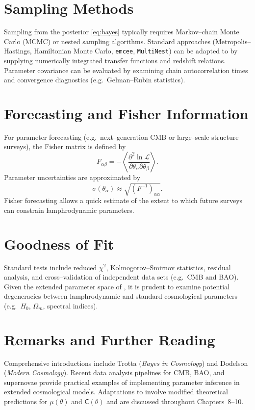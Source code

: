 \section{Sampling Methods}

Sampling from the posterior \eqref{eq:bayes} typically requires
Markov--chain Monte Carlo (MCMC) or nested sampling algorithms.
Standard approaches (Metropolis--Hastings, Hamiltonian Monte Carlo,
\texttt{emcee}, \texttt{MultiNest}) can be adapted to \rsvpabbr{} by
supplying numerically integrated transfer functions and redshift
relations.  Parameter covariance can be evaluated by examining chain
autocorrelation times and convergence diagnostics (e.g.\ Gelman--Rubin
statistics).

\section{Forecasting and Fisher Information}

For parameter forecasting (e.g.\ next--generation CMB or large--scale
structure surveys), the Fisher matrix is defined by
\begin{equation}
F_{\alpha\beta}=
-\left\langle
\frac{\partial^2 \ln\mathcal L}{\partial\theta_\alpha
\partial\theta_\beta}
\right\rangle.
\end{equation}
Parameter uncertainties are approximated by
\[
\sigma(\theta_\alpha)\approx \sqrt{(F^{-1})_{\alpha\alpha}}.
\]
Fisher forecasting allows a quick estimate of the extent to which
future surveys can constrain lamphrodynamic parameters.

\section{Goodness of Fit}

Standard tests include reduced $\chi^2$,
Kolmogorov--Smirnov statistics, residual analysis, and cross--validation
of independent data sets (e.g.\ CMB and BAO).  Given the extended
parameter space of \rsvpabbr{}, it is prudent to examine potential
degeneracies between lamphrodynamic and standard cosmological
parameters (e.g.\ $H_0$, $\Omega_m$, spectral indices).

\section{Remarks and Further Reading}

Comprehensive introductions include Trotta (\emph{Bayes in Cosmology})
and Dodelson (\emph{Modern Cosmology}).  Recent data analysis
pipelines for CMB, BAO, and supernovae provide practical examples of
implementing parameter inference in extended cosmological models.
Adaptations to \rsvpabbr{} involve modified theoretical predictions
for $\mu(\theta)$ and $\mathsf C(\theta)$ and are discussed throughout
Chapters~8--10.

